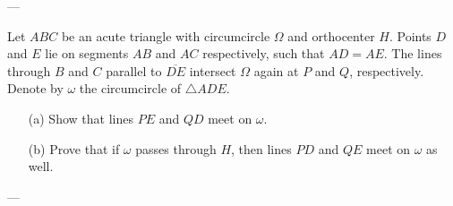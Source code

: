 
---

Let $ABC$ be an acute triangle with circumcircle $\Omega$ and orthocenter $H$. Points $D$ and $E$ lie on segments $AB$ and $AC$ respectively, such that $AD=AE$. The lines through $B$ and $C$ parallel to $\overline{DE}$ intersect $\Omega$ again at $P$ and $Q$, respectively. Denote by $\omega$ the circumcircle of $\triangle ADE$.
\begin{itemize}
    \item[(a)] Show that lines $PE$ and $QD$ meet on $\omega$.
        \vspace{-0.5em}
    \item[(b)] Prove that if $\omega$ passes through $H$, then lines $PD$ and $QE$ meet on $\omega$ as well.
\end{itemize}

---

